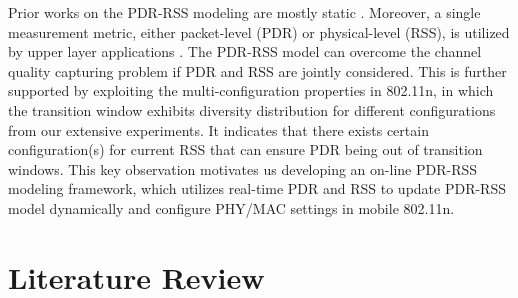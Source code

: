 \documentclass[draftclsnofoot,journal,onecolumn,11pt]{IEEEtran}
\begin{document}
Prior works on the PDR-RSS modeling are mostly static \cite{kashyap2007capacity} \cite{kolar2011mesh} \cite{reis2006model}. Moreover, a single measurement metric, either packet-level (PDR) or physical-level (RSS), is utilized by upper layer applications\cite{judd2008efficient} \cite{zhang2008practical}. The PDR-RSS model can overcome the channel quality capturing problem if PDR and RSS are jointly considered. This is further supported by exploiting the multi-configuration properties in 802.11n, in which the transition window exhibits diversity distribution for different configurations from our extensive experiments. It indicates that there exists certain configuration(s) for current RSS that can ensure PDR being out of transition windows. This key observation motivates us developing an on-line PDR-RSS modeling framework, which utilizes real-time PDR and RSS to update PDR-RSS model dynamically and configure PHY/MAC settings in mobile 802.11n.
%
%
%
%
%
%

\section{Literature Review}
\end{document}
